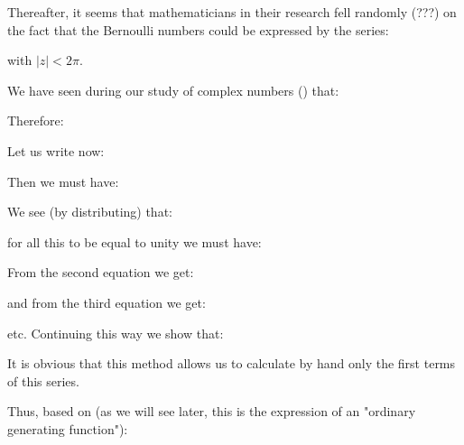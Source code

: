 	\begin{theorem}
	Thereafter, it seems that mathematicians in their research fell randomly (???) on the fact that the Bernoulli numbers could be expressed by the series:
	
	with $\vert z\vert<2\pi$.
	\end{theorem}
	\begin{dem}
	We have seen during our study of complex numbers () that:
		
		Therefore:
		
		Let us write now:
		
		Then we must have:
		
		We see (by distributing) that:
		
		for all this to be equal to unity we must have:
		
		From the second equation we get:
		
		and from the third equation we get:
		
		etc. Continuing this way we show that:
		
		It is obvious that this method allows us to calculate by hand only the first terms of this series.
		
		Thus, based on (as we will see later, this is the expression of an "ordinary generating function"):
		

\end{dem}
